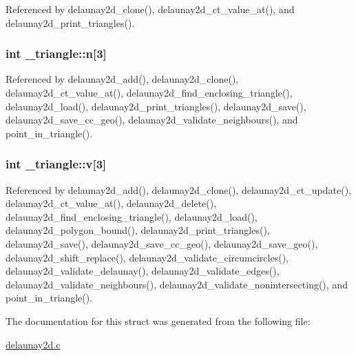 Referenced by delaunay2d\+\_\+clone(), delaunay2d\+\_\+ct\+\_\+value\+\_\+at(), and delaunay2d\+\_\+print\+\_\+triangles().

\subsubsection[{\texorpdfstring{n}{n}}]{\setlength{\rightskip}{0pt plus 5cm}int \+\_\+triangle\+::n\mbox{[}3\mbox{]}}\hypertarget{struct__triangle_ab7ec3e27930817427786c8bcd35b6736}{}\label{struct__triangle_ab7ec3e27930817427786c8bcd35b6736}


Referenced by delaunay2d\+\_\+add(), delaunay2d\+\_\+clone(), delaunay2d\+\_\+ct\+\_\+value\+\_\+at(), delaunay2d\+\_\+find\+\_\+enclosing\+\_\+triangle(), delaunay2d\+\_\+load(), delaunay2d\+\_\+print\+\_\+triangles(), delaunay2d\+\_\+save(), delaunay2d\+\_\+save\+\_\+cc\+\_\+geo(), delaunay2d\+\_\+validate\+\_\+neighbours(), and point\+\_\+in\+\_\+triangle().

\subsubsection[{\texorpdfstring{v}{v}}]{\setlength{\rightskip}{0pt plus 5cm}int \+\_\+triangle\+::v\mbox{[}3\mbox{]}}\hypertarget{struct__triangle_a7d27d9b4cf5c1d23c396bdaa90113f28}{}\label{struct__triangle_a7d27d9b4cf5c1d23c396bdaa90113f28}


Referenced by delaunay2d\+\_\+add(), delaunay2d\+\_\+clone(), delaunay2d\+\_\+ct\+\_\+update(), delaunay2d\+\_\+ct\+\_\+value\+\_\+at(), delaunay2d\+\_\+delete(), delaunay2d\+\_\+find\+\_\+enclosing\+\_\+triangle(), delaunay2d\+\_\+load(), delaunay2d\+\_\+polygon\+\_\+bound(), delaunay2d\+\_\+print\+\_\+triangles(), delaunay2d\+\_\+save(), delaunay2d\+\_\+save\+\_\+cc\+\_\+geo(), delaunay2d\+\_\+save\+\_\+geo(), delaunay2d\+\_\+shift\+\_\+replace(), delaunay2d\+\_\+validate\+\_\+circumcircles(), delaunay2d\+\_\+validate\+\_\+delaunay(), delaunay2d\+\_\+validate\+\_\+edges(), delaunay2d\+\_\+validate\+\_\+neighbours(), delaunay2d\+\_\+validate\+\_\+nonintersecting(), and point\+\_\+in\+\_\+triangle().



The documentation for this struct was generated from the following file\+:\begin{DoxyCompactItemize}
\item 
\hyperlink{delaunay2d_8c}{delaunay2d.\+c}\end{DoxyCompactItemize}
